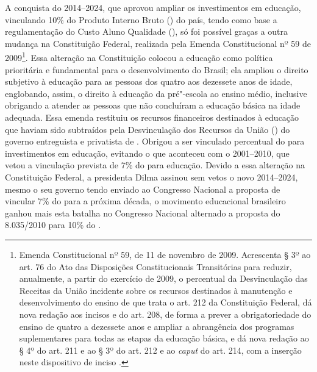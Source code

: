 A conquista do  2014--2024, que aprovou ampliar os investimentos em
educação, vinculando 10\% do Produto Interno Bruto () do país, tendo
como base a regulamentação do Custo Aluno Qualidade (), só foi
possível graças a outra mudança na Constituição Federal, realizada pela
Emenda Constitucional nº 59 de 2009\footnote{Emenda
  Constitucional nº 59, de 11 de novembro de 2009. Acrescenta § 3º ao
  art. 76 do Ato das Disposições Constitucionais Transitórias para
  reduzir, anualmente, a partir do exercício de 2009, o percentual da
  Desvinculação das Receitas da União incidente sobre os recursos
  destinados à manutenção e desenvolvimento do ensino de que trata o
  art. 212 da Constituição Federal, dá nova redação aos incisos  e 
  do art. 208, de forma a prever a obrigatoriedade do ensino de quatro a
  dezessete anos e ampliar a abrangência dos programas suplementares
  para todas as etapas da educação básica, e dá nova redação ao § 4º do
  art. 211 e ao § 3º do art. 212 e ao \emph{caput} do art. 214, com a
  inserção neste dispositivo de inciso .}. Essa alteração na
Constituição colocou a educação como política prioritária e fundamental
para o desenvolvimento do Brasil; ela ampliou o direito subjetivo à
educação para as pessoas dos quatro aos dezessete anos de idade,
englobando, assim, o direito à educação da pré"-escola ao ensino médio,
inclusive obrigando a atender as pessoas que não concluíram a educação
básica na idade adequada. Essa emenda restituiu os recursos financeiros
destinados à educação que haviam sido subtraídos pela Desvinculação dos
Recursos da União () do governo entreguista e privatista de .
Obrigou a ser vinculado percentual do  para investimentos
em educação, evitando o que aconteceu com o  2001--2010, que  vetou
a vinculação prevista de 7\% do  para educação. Devido a essa
alteração na Constituição Federal, a presidenta Dilma assinou sem vetos
o novo  2014--2024, mesmo o seu governo tendo enviado ao Congresso
Nacional a proposta de vincular 7\% do  para a próxima década, o
movimento educacional brasileiro ganhou mais esta batalha no Congresso
Nacional alternado a proposta do  8.035/2010 para 10\% do .

